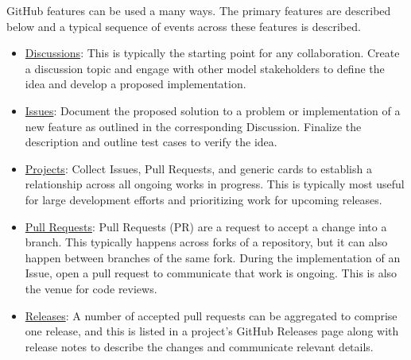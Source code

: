 \documentclass[]{nrel}
\begin{document}
GitHub features can be used a many ways. The primary features are described below and a typical
sequence of events across these features is described.
\begin{itemize}
\item \href{https://docs.github.com/en/discussions}{Discussions}: This is typically the starting point
for any collaboration. Create a discussion topic and engage with other model stakeholders
to define the idea and develop a proposed implementation.

\item \href{https://docs.github.com/en/issues/tracking-your-work-with-issues/about-issues}{Issues}:
Document the proposed solution to a problem or implementation of a new feature as outlined
in the corresponding Discussion. Finalize the description and outline test cases to verify
the idea.

\item \href{https://docs.github.com/en/issues/planning-and-tracking-with-projects/learning-about-projects/about-projects}{Projects}:
Collect Issues, Pull Requests, and generic cards to establish a relationship across all
ongoing works in progress. This is typically most useful for large development efforts
and prioritizing work for upcoming releases.

\item \href{https://docs.github.com/en/pull-requests/collaborating-with-pull-requests/proposing-changes-to-your-work-with-pull-requests/about-pull-requests}{Pull Requests}:
Pull Requests (PR) are a request to accept a change into a branch. This typically happens
across forks of a repository, but it can also happen between branches of the same fork.
During the implementation of an Issue, open a pull request to communicate that work is
ongoing. This is also the venue for code reviews.

\item \href{https://docs.github.com/en/repositories/releasing-projects-on-github/about-releases}{Releases}:
A number of accepted pull requests can be aggregated to comprise one release, and this is
listed in a project’s GitHub Releases page along with release notes to describe the changes
and communicate relevant details.

\end{itemize}
\end{document}
